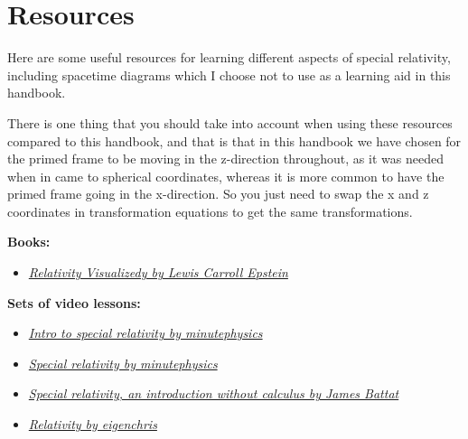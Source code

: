 \chapter{Resources}\label{ch: Resources}


Here are some useful resources for learning different aspects of special relativity, including spacetime diagrams which I choose not to use as a learning aid in this handbook.

There is one thing that you should take into account when using these resources compared to this handbook, and that is that in this handbook we have chosen for the primed frame to be moving in the z-direction throughout, as it was needed when in came to spherical coordinates, whereas it is more common to have the primed frame going in the x-direction.
So you just need to swap the x and z coordinates in transformation equations to get the same transformations.
\newline

\textbf{Books:}
\begin{itemize}
    \item \href{https://openlibrary.org/books/OL8392037M/Relativity_Visualized}{\textit{Relativity Visualizedy by Lewis Carroll Epstein}}
\end{itemize}

\textbf{Sets of video lessons:}
\begin{itemize}
    \item \href{https://youtube.com/playlist?list=PLoaVOjvkzQtyjhV55wZcdicAz5KexgKvm&si=d2qR7S71wkt6K_W9}{\textit{Intro to special relativity by minutephysics}}
    \item \href{https://youtube.com/playlist?list=PL712E709B05086D32&si=UX-K9QJLy0s8mjaq}{\textit{Special relativity by minutephysics}}
    \item \href{https://youtube.com/playlist?list=PLchEOLrE108KU6bxnuitZuUtsZh2O68NP&si=O9ZuF57iEB7BHjXX}{\textit{Special relativity, an introduction without calculus by James Battat}}
    \item \href{https://youtube.com/playlist?list=PLJHszsWbB6hqlw73QjgZcFh4DrkQLSCQa&si=s7mA7YdZrV1sV8tf}{\textit{Relativity by eigenchris}}
\end{itemize}

